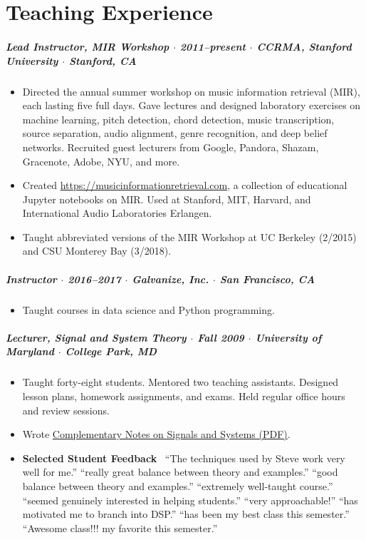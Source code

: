 \documentclass[10pt,letterpaper]{article}
\begin{document}
\section*{Teaching Experience}

\subparagraph{Lead Instructor, MIR Workshop $\cdot$ \textnormal{2011--present} $\cdot$ CCRMA, Stanford University $\cdot$ \textnormal{Stanford, CA}}
\begin{itemize}
    \item Directed the annual summer workshop on music information retrieval (MIR), each lasting five full days.  Gave lectures and designed laboratory exercises on machine learning, pitch detection, chord detection, music transcription, source separation, audio alignment, genre recognition, and deep belief networks. Recruited guest lecturers from Google, Pandora, Shazam, Gracenote, Adobe, NYU, and more.
    \item Created \url{https://musicinformationretrieval.com}, a collection of educational Jupyter notebooks on MIR. Used at Stanford, MIT, Harvard, and International Audio Laboratories Erlangen.
    \item Taught abbreviated versions of the MIR Workshop at UC Berkeley (2/2015) and CSU Monterey Bay (3/2018).
\end{itemize}

\subparagraph{Instructor $\cdot$ \textnormal{2016--2017} $\cdot$ Galvanize, Inc. $\cdot$ \textnormal{San Francisco, CA}}
\begin{itemize}
    \item Taught courses in data science and Python programming.
\end{itemize}

\subparagraph{Lecturer, Signal and System Theory $\cdot$ \textnormal{Fall 2009} $\cdot$ University of Maryland $\cdot$ \textnormal{College Park, MD}}
\begin{itemize}
    \item Taught forty-eight students. Mentored two teaching assistants. Designed lesson plans, homework assignments, and exams. Held regular office hours and review sessions.
    \item Wrote \href{http://up.stevetjoa.com/notes322_20091119.pdf}{Complementary Notes on Signals and Systems (PDF)}.
    \item \textbf{Selected Student Feedback} \ ``The techniques used by Steve work very well for me.'' ``really great balance between theory and examples.'' ``good balance between theory and examples.'' ``extremely well-taught course.'' ``seemed genuinely interested in helping students.'' ``very approachable!'' ``has motivated me to branch into DSP.'' ``has been my best class this semester.'' ``Awesome class!!! my favorite this semester.''
\end{itemize}
\end{document}
